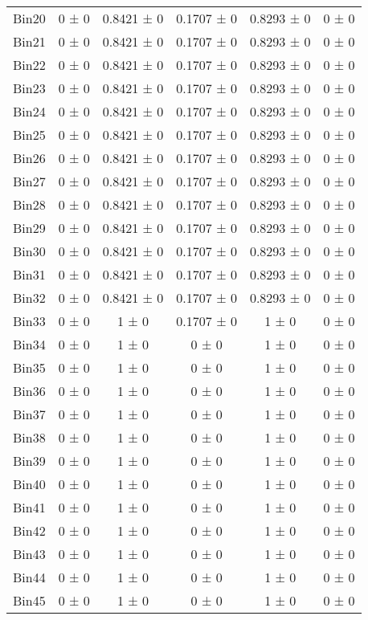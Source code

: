 \begin{tabular}{@{\extracolsep{4pt}}lccccc@{}}
     Bin20 & 0 ± 0 & 0.8421 ± 0 & 0.1707 ± 0 & 0.8293 ± 0 & 0 ± 0 \\ 
     Bin21 & 0 ± 0 & 0.8421 ± 0 & 0.1707 ± 0 & 0.8293 ± 0 & 0 ± 0 \\ 
     Bin22 & 0 ± 0 & 0.8421 ± 0 & 0.1707 ± 0 & 0.8293 ± 0 & 0 ± 0 \\ 
     Bin23 & 0 ± 0 & 0.8421 ± 0 & 0.1707 ± 0 & 0.8293 ± 0 & 0 ± 0 \\ 
     Bin24 & 0 ± 0 & 0.8421 ± 0 & 0.1707 ± 0 & 0.8293 ± 0 & 0 ± 0 \\ 
     Bin25 & 0 ± 0 & 0.8421 ± 0 & 0.1707 ± 0 & 0.8293 ± 0 & 0 ± 0 \\ 
     Bin26 & 0 ± 0 & 0.8421 ± 0 & 0.1707 ± 0 & 0.8293 ± 0 & 0 ± 0 \\ 
     Bin27 & 0 ± 0 & 0.8421 ± 0 & 0.1707 ± 0 & 0.8293 ± 0 & 0 ± 0 \\ 
     Bin28 & 0 ± 0 & 0.8421 ± 0 & 0.1707 ± 0 & 0.8293 ± 0 & 0 ± 0 \\ 
     Bin29 & 0 ± 0 & 0.8421 ± 0 & 0.1707 ± 0 & 0.8293 ± 0 & 0 ± 0 \\ 
     Bin30 & 0 ± 0 & 0.8421 ± 0 & 0.1707 ± 0 & 0.8293 ± 0 & 0 ± 0 \\ 
     Bin31 & 0 ± 0 & 0.8421 ± 0 & 0.1707 ± 0 & 0.8293 ± 0 & 0 ± 0 \\ 
     Bin32 & 0 ± 0 & 0.8421 ± 0 & 0.1707 ± 0 & 0.8293 ± 0 & 0 ± 0 \\ 
     Bin33 & 0 ± 0 & 1 ± 0 & 0.1707 ± 0 & 1 ± 0 & 0 ± 0 \\ 
     Bin34 & 0 ± 0 & 1 ± 0 & 0 ± 0 & 1 ± 0 & 0 ± 0 \\ 
     Bin35 & 0 ± 0 & 1 ± 0 & 0 ± 0 & 1 ± 0 & 0 ± 0 \\ 
     Bin36 & 0 ± 0 & 1 ± 0 & 0 ± 0 & 1 ± 0 & 0 ± 0 \\ 
     Bin37 & 0 ± 0 & 1 ± 0 & 0 ± 0 & 1 ± 0 & 0 ± 0 \\ 
     Bin38 & 0 ± 0 & 1 ± 0 & 0 ± 0 & 1 ± 0 & 0 ± 0 \\ 
     Bin39 & 0 ± 0 & 1 ± 0 & 0 ± 0 & 1 ± 0 & 0 ± 0 \\ 
     Bin40 & 0 ± 0 & 1 ± 0 & 0 ± 0 & 1 ± 0 & 0 ± 0 \\ 
     Bin41 & 0 ± 0 & 1 ± 0 & 0 ± 0 & 1 ± 0 & 0 ± 0 \\ 
     Bin42 & 0 ± 0 & 1 ± 0 & 0 ± 0 & 1 ± 0 & 0 ± 0 \\ 
     Bin43 & 0 ± 0 & 1 ± 0 & 0 ± 0 & 1 ± 0 & 0 ± 0 \\ 
     Bin44 & 0 ± 0 & 1 ± 0 & 0 ± 0 & 1 ± 0 & 0 ± 0 \\ 
     Bin45 & 0 ± 0 & 1 ± 0 & 0 ± 0 & 1 ± 0 & 0 ± 0 \\ 

\end{tabular}
